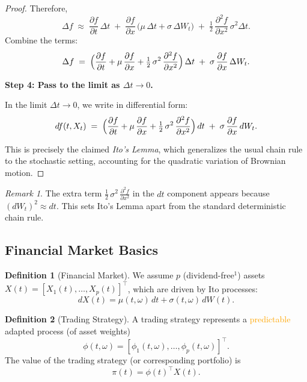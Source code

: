 \documentclass[a4paper,11pt]{book}
\theoremstyle{definition}
\newtheorem{definition}{Definition}[section]
\theoremstyle{remark}
\newtheorem*{remark}{Remark}
\begin{document}
\begin{proof}
Therefore,
\[
   \Delta f 
   \;\approx\;
   \frac{\partial f}{\partial t}\,\Delta t
   \;+\;
   \frac{\partial f}{\partial x}\,\bigl(\mu\,\Delta t + \sigma\,\Delta W_t\bigr)
   \;+\;
   \tfrac{1}{2}\,\frac{\partial^2 f}{\partial x^2}\,\sigma^2 \Delta t.
\]
Combine the terms:
\[
   \Delta f
   \;=\;
   \Bigl(\frac{\partial f}{\partial t} 
         + \mu\,\frac{\partial f}{\partial x} 
         + \tfrac{1}{2}\,\sigma^2\,\frac{\partial^2 f}{\partial x^2}\Bigr)\,\Delta t
   \;+\;
   \sigma\,\frac{\partial f}{\partial x}\,\Delta W_t.
\]

\medskip
\textbf{Step 4: Pass to the limit as $\Delta t \to 0$.}

In the limit $\Delta t \to 0$, we write in differential form:
\[
   df(t,X_t)
   \;=\;
   \Bigl(\frac{\partial f}{\partial t} 
         + \mu\,\frac{\partial f}{\partial x} 
         + \tfrac{1}{2}\,\sigma^2\,\frac{\partial^2 f}{\partial x^2}\Bigr)\,dt
   \;+\;
   \sigma\,\frac{\partial f}{\partial x}\,dW_t.
\]

This is precisely the claimed \emph{Ito's Lemma}, which generalizes the usual chain rule to the stochastic setting, accounting for the quadratic variation of Brownian motion.
\end{proof}

\begin{remark}
The extra term $\tfrac{1}{2}\,\sigma^2\,\frac{\partial^2 f}{\partial x^2}$ in the $dt$ component
appears because $(dW_t)^2 \approx dt$. This sets Ito's Lemma apart from the standard
deterministic chain rule.
\end{remark}


\subsection{Financial Market Basics}
\begin{definition}[Financial Market]
We assume \( p \) (dividend-free\(^1\)) assets \( X(t) = [X_1(t), \dots, X_p(t)]^\top \), which are driven by Ito processes:
\[
dX(t) = \mu(t, \omega)\,dt + \sigma(t, \omega)\,dW(t).
\]
\end{definition}

\begin{definition}[Trading Strategy]
A trading strategy represents a \textcolor{orange}{predictable} adapted process (of asset weights)
\[
\phi(t, \omega) = [\phi_1(t, \omega), \dots, \phi_p(t, \omega)]^\top.
\]
The value of the trading strategy (or corresponding portfolio) is
\[
\pi(t) = \phi(t)^\top X(t).
\]
\end{definition}
\end{document}
